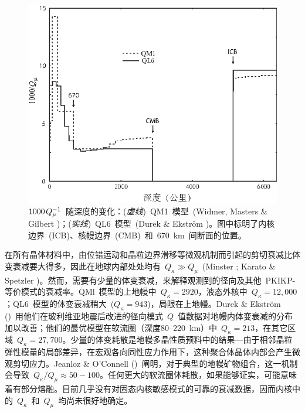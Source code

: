 \begin{figure}[!t]
\begin{center}
\includegraphics{../figures/chap09/fig17.eps}
\end{center}
\caption[Qmodels]{\label{9.fig.Qmods}
%
%
$1000\hspace{0.4 mm}Q_{\mu}^{-1}$~随深度的变化：({\em 虚线\/})~QM1~模型~(Widmer, Masters \& Gilbert
\citeyear{widmer&al91})；({\em 实线\/})~QL6~模型~(Durek \& Ekstr\"{o}m \citeyear{durek&ekstrom96})。图中标明了内核边界~(ICB)、核幔边界~(CMB)~和~670~km~间断面的位置。
}
\end{figure}
在所有晶体材料中，由位错运动和晶粒边界滑移等微观机制而引起的剪切衰减比体变衰减要大得多，因此在地球内部处处均有~$Q_{\kappa}\gg Q_{\mu}$~(Minster \citeyear{minster80}; Karato \& Spetzler \citeyear{karato&spetzler90})。然而，需要有少量的体变衰减，来解释观测到的径向及其他~PKIKP-等价模式的衰减率。QMl~模型的上地幔中~$Q_{\kappa}=2920$，液态外核中~$Q_{\kappa}=12,000$；QL6~模型的体变衰减稍大~($Q_{\kappa}=943$)，局限在上地幔。Durek \& Ekstr\"{o}m
(\citeyear{durek&ekstrom95})~用他们在玻利维亚地震后改进的径向模式~$Q$~值数据对地幔内体变衰减的分布加以改善；他们的最优模型在软流圈（深度80--220~km）中~$Q_{\kappa}=213$，在其它区域~$Q_{\kappa}=27,700$。少量的体变耗散是地幔多晶性质预料中的结果---由于相邻晶粒弹性模量的局部差异，在宏观各向同性应力作用下，这种聚合体晶体内部会产生微观剪切应力。Jeanloz \& O'Connell (\citeyear{heinz&al82})~阐明，对于典型的地幔矿物组合，这一机制会导致~$Q_{\kappa}/Q_{\mu}\approx 50\!-\!100$。任何更大的软流圈体耗散，如果能够证实，可能意味着有部分熔融。目前几乎没有对固态内核敏感模式的可靠的衰减数据，因而内核中的~$Q_{\kappa}$~和~$Q_{\mu}$~均尚未很好地确定。

